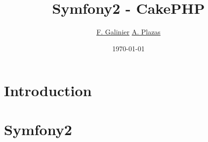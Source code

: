 \usepackage{listings}
\usepackage{hyperref}
\usepackage{verbatim}

\title{\textbf{Symfony2 - CakePHP}}
\author{
  \href{mailto:florian.galinier@etud.univ-montp2.fr}{F. Galinier}
  \href{mailto:adrien.plazas@etud.univ-montp2.fr}{A. Plazas}
}
\date{\today}



\begin{frame}
\titlepage
\end{frame}

\section{Introduction}


\section{Symfony2}



